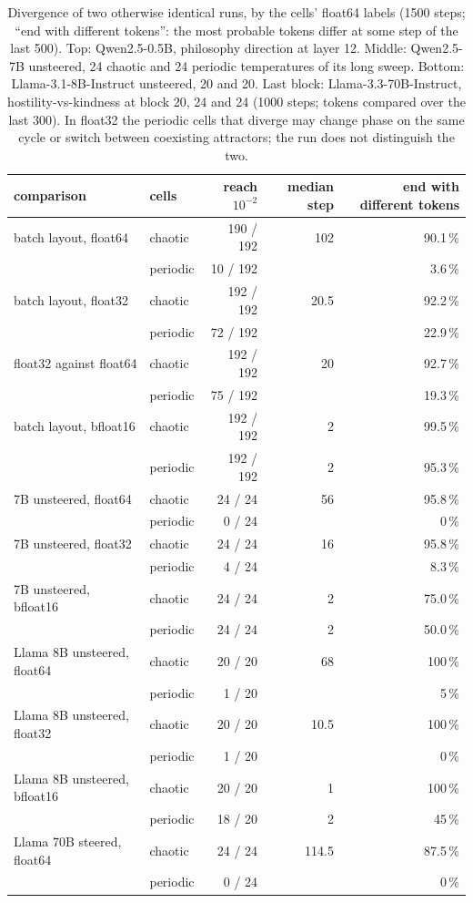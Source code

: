 \documentclass[11pt,letterpaper]{article}
\begin{document}
\begin{table}[tbp]
\centering\small
\begin{tabular}{llrrr}
\toprule
comparison & cells & reach $10^{-2}$ & median step & end with different tokens \\
\midrule
batch layout, float64 & chaotic & 190 / 192 & 102 & 90.1\,\% \\
 & periodic & 10 / 192 & & 3.6\,\% \\
batch layout, float32 & chaotic & 192 / 192 & 20.5 & 92.2\,\% \\
 & periodic & 72 / 192 & & 22.9\,\% \\
float32 against float64 & chaotic & 192 / 192 & 20 & 92.7\,\% \\
 & periodic & 75 / 192 & & 19.3\,\% \\
batch layout, bfloat16 & chaotic & 192 / 192 & 2 & 99.5\,\% \\
 & periodic & 192 / 192 & 2 & 95.3\,\% \\
\midrule
7B unsteered, float64 & chaotic & 24 / 24 & 56 & 95.8\,\% \\
 & periodic & 0 / 24 & & 0\,\% \\
7B unsteered, float32 & chaotic & 24 / 24 & 16 & 95.8\,\% \\
 & periodic & 4 / 24 & & 8.3\,\% \\
7B unsteered, bfloat16 & chaotic & 24 / 24 & 2 & 75.0\,\% \\
 & periodic & 24 / 24 & 2 & 50.0\,\% \\
\midrule
Llama 8B unsteered, float64 & chaotic & 20 / 20 & 68 & 100\,\% \\
 & periodic & 1 / 20 & & 5\,\% \\
Llama 8B unsteered, float32 & chaotic & 20 / 20 & 10.5 & 100\,\% \\
 & periodic & 1 / 20 & & 0\,\% \\
Llama 8B unsteered, bfloat16 & chaotic & 20 / 20 & 1 & 100\,\% \\
 & periodic & 18 / 20 & 2 & 45\,\% \\
\midrule
Llama 70B steered, float64 & chaotic & 24 / 24 & 114.5 & 87.5\,\% \\
 & periodic & 0 / 24 & & 0\,\% \\
\bottomrule
\end{tabular}
\caption{Divergence of two otherwise identical runs, by the cells' float64 labels (1500 steps; ``end with different
tokens'': the most probable tokens differ at some step of the last 500). Top: Qwen2.5-0.5B, philosophy direction at
layer 12. Middle: Qwen2.5-7B unsteered, 24 chaotic and 24 periodic temperatures of its long sweep. Bottom:
Llama-3.1-8B-Instruct unsteered, 20 and 20. Last block: Llama-3.3-70B-Instruct, hostility-vs-kindness at block 20, 24
and 24 (1000 steps; tokens compared over the last 300). In float32 the periodic cells that diverge may
change phase on the same cycle or switch between coexisting attractors; the run does not distinguish the two.}
\label{tab:repro}
\end{table}
\end{document}
